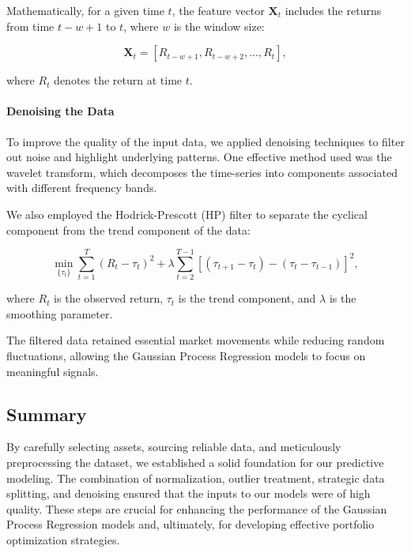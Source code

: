 Mathematically, for a given time $t$, the feature vector $\mathbf{X}_t$ includes the returns from time $t - w + 1$ to $t$, where $w$ is the window size:

\begin{equation}
    \mathbf{X}_t = [R_{t - w + 1}, R_{t - w + 2}, \dots, R_t],
\end{equation}

where $R_t$ denotes the return at time $t$.

\paragraph{Denoising the Data}

To improve the quality of the input data, we applied denoising techniques to filter out noise and highlight underlying patterns. One effective method used was the wavelet transform, which decomposes the time-series into components associated with different frequency bands.

We also employed the Hodrick-Prescott (HP) filter to separate the cyclical component from the trend component of the data:

\begin{equation}
    \min_{\{ \tau_t \}} \sum_{t=1}^{T} (R_t - \tau_t)^2 + \lambda \sum_{t=2}^{T-1} \left[ (\tau_{t+1} - \tau_t) - (\tau_t - \tau_{t-1}) \right]^2,
\end{equation}

where $R_t$ is the observed return, $\tau_t$ is the trend component, and $\lambda$ is the smoothing parameter.

The filtered data retained essential market movements while reducing random fluctuations, allowing the Gaussian Process Regression models to focus on meaningful signals.

\subsection{Summary}

By carefully selecting assets, sourcing reliable data, and meticulously preprocessing the dataset, we established a solid foundation for our predictive modeling. The combination of normalization, outlier treatment, strategic data splitting, and denoising ensured that the inputs to our models were of high quality. These steps are crucial for enhancing the performance of the Gaussian Process Regression models and, ultimately, for developing effective portfolio optimization strategies.



